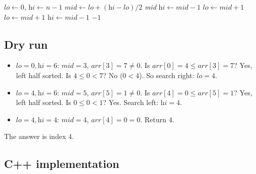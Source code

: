 \begin{algorithm}[H]
\caption{Search in Rotated Sorted Array (Distinct Elements)}
\begin{algorithmic}[1]
  \State $\textit{lo} \gets 0$, $\textit{hi} \gets n-1$
    \State $\textit{mid} \gets \textit{lo}+(\textit{hi}-\textit{lo})/2$
     \Return \textit{mid} \EndIf
        \State $\textit{hi} \gets \textit{mid} - 1$
      \Else
        \State $\textit{lo} \gets \textit{mid} + 1$
      \EndIf
    \Else
        \State $\textit{lo} \gets \textit{mid} + 1$
      \Else
        \State $\textit{hi} \gets \textit{mid} - 1$
      \EndIf
    \EndIf
  \EndWhile
  \State \Return $-1$
\EndProcedure
\end{algorithmic}
\end{algorithm}

\subsection*{Dry run}


\begin{itemize}
  \item $\textit{lo}=0,\textit{hi}=6$: $\textit{mid}=3$,
        $\textit{arr}[3]=7 \ne 0$. Is $\textit{arr}[0]=4 \le
        \textit{arr}[3]=7$? Yes, left half sorted. Is
        $4 \le 0 < 7$? No ($0 < 4$). So search right:
        $\textit{lo}=4$.
  \item $\textit{lo}=4,\textit{hi}=6$: $\textit{mid}=5$,
        $\textit{arr}[5]=1 \ne 0$. Is $\textit{arr}[4]=0 \le
        \textit{arr}[5]=1$? Yes, left half sorted. Is
        $0 \le 0 < 1$? Yes. Search left: $\textit{hi}=4$.
  \item $\textit{lo}=4,\textit{hi}=4$: $\textit{mid}=4$,
        $\textit{arr}[4]=0 = 0$. Return $4$.
\end{itemize}

The answer is index $4$.

\subsection*{C++ implementation}

